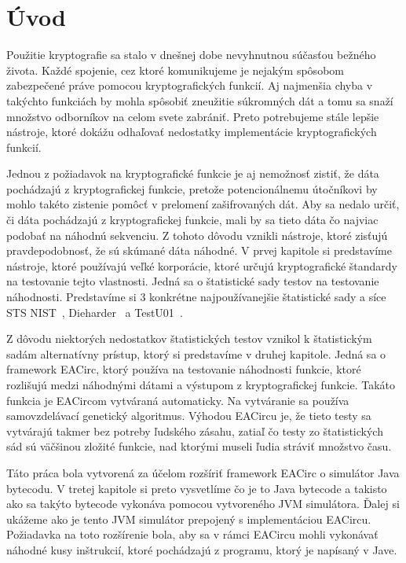 \chapter*{Úvod}
\label{chap:introduction}

Použitie kryptografie sa stalo v dnešnej dobe nevyhnutnou súčasťou bežného života. Každé spojenie, cez ktoré komunikujeme je nejakým spôsobom zabezpečené práve pomocou kryptografických funkcií. Aj najmenšia chyba v takýchto funkciách by mohla spôsobiť zneužitie súkromných dát a tomu sa snaží množstvo odborníkov na celom svete zabrániť. Preto potrebujeme stále lepšie nástroje, ktoré dokážu odhaľovať nedostatky implementácie kryptografických funkcií.

Jednou z požiadavok na kryptografické funkcie je aj nemožnosť zistiť, že dáta pochádzajú z kryptografickej funkcie, pretože potencionálnemu útočníkovi by mohlo takéto zistenie pomôcť v prelomení zašifrovaných dát. Aby sa nedalo určiť, či dáta pochádzajú z kryptografickej funkcie, mali by sa tieto dáta čo najviac podobať na náhodnú sekvenciu. Z tohoto dôvodu vznikli nástroje, ktoré zisťujú pravdepodobnosť, že sú skúmané dáta náhodné. V prvej kapitole si predstavíme nástroje, ktoré používajú veľké korporácie, ktoré určujú kryptografické štandardy na testovanie tejto vlastnosti. Jedná sa o štatistické sady testov na testovanie náhodnosti. Predstavíme si 3 konkrétne najpoužívanejšie štatistické sady a síce {STS NIST}~\parencite{nist-sts-documentation}, Dieharder~\parencite{dieharder} a TestU01~\parencite{testu01}. 

Z dôvodu niektorých nedostatkov štatistických testov vznikol k štatistickým sadám alternatívny prístup, ktorý si predstavíme v druhej kapitole. Jedná sa o framework EACirc, ktorý používa na testovanie náhodnosti funkcie, ktoré rozlišujú medzi náhodnými dátami a výstupom z kryptografickej funkcie. Takáto funkcia je EACircom vytváraná automaticky. Na vytváranie sa používa samovzdelávací genetický algoritmus. Výhodou EACircu je, že tieto testy sa vytvárajú takmer bez potreby ľudského zásahu, zatiaľ čo testy zo štatistických sád sú väčšinou zložité funkcie, nad ktorými museli ľudia stráviť množstvo času.

Táto práca bola vytvorená za účelom rozšíriť framework EACirc o simulátor Java bytecodu. V tretej kapitole si preto vysvetlíme čo je to Java bytecode a takisto ako sa takýto bytecode vykonáva pomocou vytvoreného JVM simulátora. Ďalej si ukážeme ako je tento JVM simulátor prepojený s implementáciou EACircu. Požiadavka na toto rozšírenie bola, aby sa v rámci EACircu mohli vykonávať náhodné kusy inštrukcií, ktoré pochádzajú z programu, ktorý je napísaný v Jave. 

